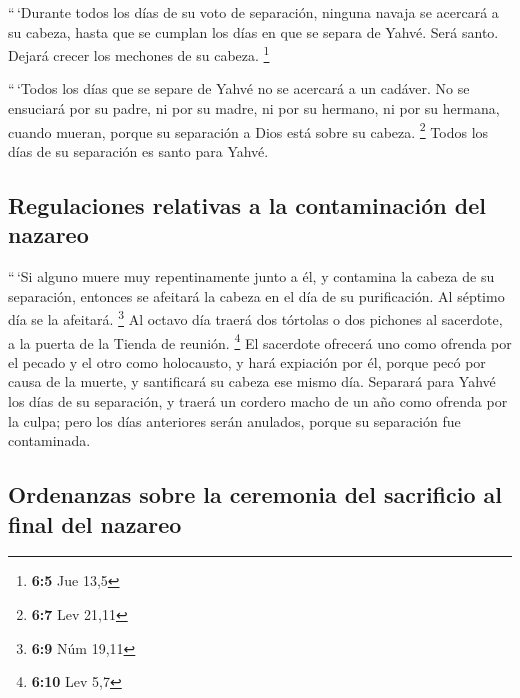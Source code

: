  ``\,`Durante todos los días de su voto de separación,
ninguna navaja se acercará a su cabeza, hasta que se cumplan los días en
que se separa de Yahvé. Será santo. Dejará crecer los mechones de su
cabeza. \footnote{\textbf{6:5} Jue 13,5}

 ``\,`Todos los días que se separe de Yahvé no se acercará
a un cadáver.  No se ensuciará por su padre, ni por su
madre, ni por su hermano, ni por su hermana, cuando mueran, porque su
separación a Dios está sobre su cabeza. \footnote{\textbf{6:7} Lev 21,11}
 Todos los días de su separación es santo para Yahvé.

\hypertarget{regulaciones-relativas-a-la-contaminaciuxf3n-del-nazareo}{%
\subsection{Regulaciones relativas a la contaminación del
nazareo}\label{regulaciones-relativas-a-la-contaminaciuxf3n-del-nazareo}}

 ``\,`Si alguno muere muy repentinamente junto a él, y
contamina la cabeza de su separación, entonces se afeitará la cabeza en
el día de su purificación. Al séptimo día se la afeitará. \footnote{\textbf{6:9}
  Núm 19,11}  Al octavo día traerá dos tórtolas o dos
pichones al sacerdote, a la puerta de la Tienda de reunión. \footnote{\textbf{6:10}
  Lev 5,7}  El sacerdote ofrecerá uno como ofrenda por el
pecado y el otro como holocausto, y hará expiación por él, porque pecó
por causa de la muerte, y santificará su cabeza ese mismo día.
 Separará para Yahvé los días de su separación, y traerá
un cordero macho de un año como ofrenda por la culpa; pero los días
anteriores serán anulados, porque su separación fue contaminada.

\hypertarget{ordenanzas-sobre-la-ceremonia-del-sacrificio-al-final-del-nazareo}{%
\subsection{Ordenanzas sobre la ceremonia del sacrificio al final del
nazareo}\label{ordenanzas-sobre-la-ceremonia-del-sacrificio-al-final-del-nazareo}}

